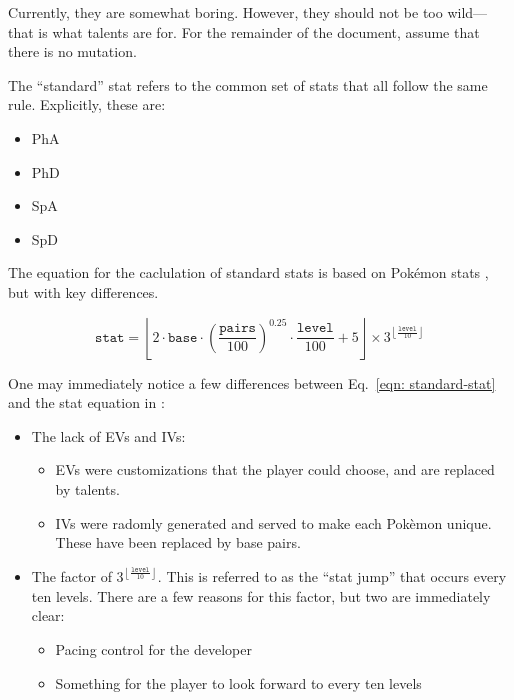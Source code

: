 Currently, they are somewhat boring. However, they should not be too wild---that is what talents are for. For the remainder of the document, assume that there is no mutation.





The ``standard'' stat refers to the common set of stats that all follow the same rule. Explicitly, these are: 

\begin{itemize}
	\item{PhA}
	\item{PhD}
	\item{SpA}
	\item{SpD}
\end{itemize}

The equation for the caclulation of standard stats is based on Pok\'{e}mon stats \cite{pkmn-stats}, but with key differences.

\begin{equation}\label{eqn: standard-stat}
	\texttt{stat} = \left\lfloor 2\cdot\texttt{base}\cdot\left(\frac{\texttt{pairs}}{100}\right)^{0.25} \cdot\frac{\texttt{level}}{100} + 5 \right\rfloor \times 3^{\left\lfloor\frac{\texttt{level}}{10}\right\rfloor}
\end{equation}

\noindent One may immediately notice a few differences between Eq.~\eqref{eqn: standard-stat} and the stat equation in \cite{pkmn-stats}:

	\begin{itemize}
		\item{The lack of EVs and IVs:
			\begin{itemize}
				\item{EVs were customizations that the player could choose, and are replaced by talents.}
				\item{IVs were radomly generated and served to make each Pok\`{e}mon unique. These have been replaced by base pairs.}
			\end{itemize}
		}
		\item{The factor of $3^{\left\lfloor\frac{\texttt{level}}{10}\right\rfloor}$. This is referred to as the ``stat jump'' that occurs every ten levels. There are a few reasons for this factor, but two are immediately clear:
		\begin{itemize}
			\item{Pacing control for the developer}
			\item{Something for the player to look forward to every ten levels}
		\end{itemize}
		}
	\end{itemize}
	
